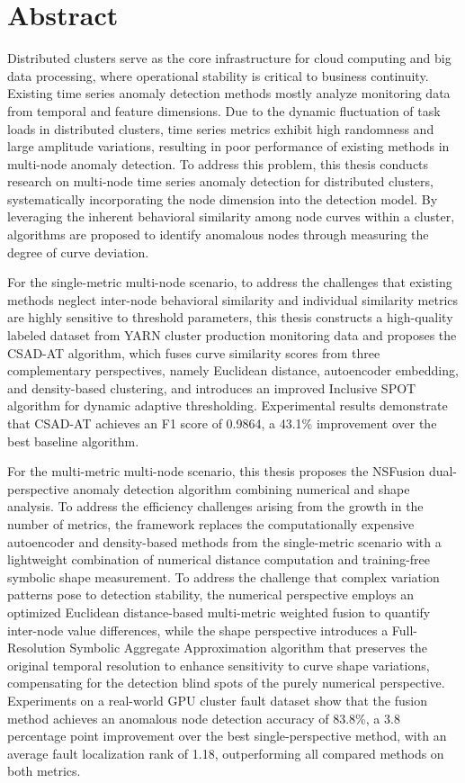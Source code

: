 \intobmk\chapter*{Abstract}%

Distributed clusters serve as the core infrastructure for cloud computing and big data processing, where operational stability is critical to business continuity. Existing time series anomaly detection methods mostly analyze monitoring data from temporal and feature dimensions. Due to the dynamic fluctuation of task loads in distributed clusters, time series metrics exhibit high randomness and large amplitude variations, resulting in poor performance of existing methods in multi-node anomaly detection. To address this problem, this thesis conducts research on multi-node time series anomaly detection for distributed clusters, systematically incorporating the node dimension into the detection model. By leveraging the inherent behavioral similarity among node curves within a cluster, algorithms are proposed to identify anomalous nodes through measuring the degree of curve deviation.

For the single-metric multi-node scenario, to address the challenges that existing methods neglect inter-node behavioral similarity and individual similarity metrics are highly sensitive to threshold parameters, this thesis constructs a high-quality labeled dataset from YARN cluster production monitoring data and proposes the CSAD-AT algorithm, which fuses curve similarity scores from three complementary perspectives, namely Euclidean distance, autoencoder embedding, and density-based clustering, and introduces an improved Inclusive SPOT algorithm for dynamic adaptive thresholding. Experimental results demonstrate that CSAD-AT achieves an F1 score of 0.9864, a 43.1\% improvement over the best baseline algorithm.

For the multi-metric multi-node scenario, this thesis proposes the NSFusion dual-perspective anomaly detection algorithm combining numerical and shape analysis. To address the efficiency challenges arising from the growth in the number of metrics, the framework replaces the computationally expensive autoencoder and density-based methods from the single-metric scenario with a lightweight combination of numerical distance computation and training-free symbolic shape measurement. To address the challenge that complex variation patterns pose to detection stability, the numerical perspective employs an optimized Euclidean distance-based multi-metric weighted fusion to quantify inter-node value differences, while the shape perspective introduces a Full-Resolution Symbolic Aggregate Approximation algorithm that preserves the original temporal resolution to enhance sensitivity to curve shape variations, compensating for the detection blind spots of the purely numerical perspective. Experiments on a real-world GPU cluster fault dataset show that the fusion method achieves an anomalous node detection accuracy of 83.8\%, a 3.8 percentage point improvement over the best single-perspective method, with an average fault localization rank of 1.18, outperforming all compared methods on both metrics.

